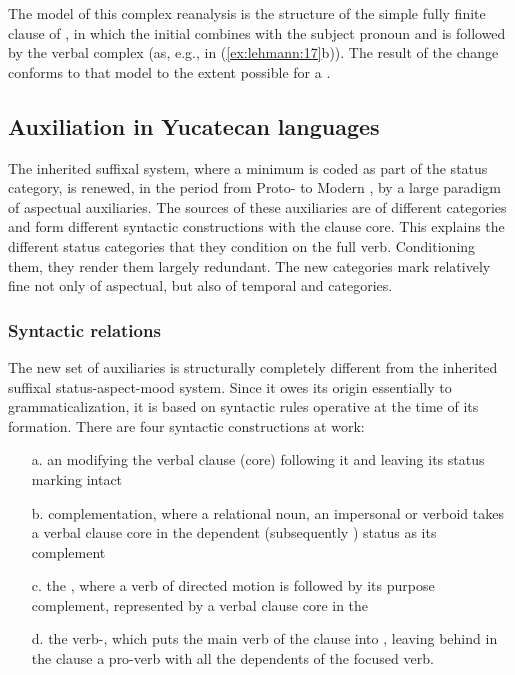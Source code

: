 \documentclass[output=paper]{langsci/langscibook}
\begin{document}
The model of this complex reanalysis is the structure of the simple fully finite clause of , in which the initial  combines with the  subject pronoun and is followed by the verbal complex (as, e.g., in (\ref{ex:lehmann:17}b)). The result of the change conforms to that model to the extent possible for a .

\subsection{Auxiliation in Yucatecan languages}\label{sec:lehmann:4.10}

The inherited suffixal system, where a minimum  is coded as part of the status category, is renewed, in the period from Proto- to Modern , by a large paradigm of aspectual auxiliaries. The sources of these auxiliaries are of different categories and form different syntactic constructions with the clause core. This explains the different status categories that they condition on the full verb. Conditioning them, they render them largely redundant. The new categories mark relatively fine  not only of aspectual, but also of temporal and  categories.

\subsubsection{Syntactic relations}\label{sec:lehmann:4.10.1}

The new set of auxiliaries is structurally completely different from the inherited suffixal status-aspect-mood system. Since it owes its origin essentially to grammaticalization, it is based on syntactic rules operative at the time of its formation. There are four syntactic constructions at work:

\begin{itemize}
\item[a.] an  modifying the verbal clause (core) following it and leaving its status marking intact

\item[b.]
complementation, where a relational noun, an impersonal  or  verboid takes a verbal clause core in the dependent (subsequently ) status as its complement

\item[c.] 
the , where a verb of directed motion is followed by its purpose complement, represented by a verbal clause core in the 

\item[d.] 
the verb-, which puts the main verb of the clause into , leaving behind in the  clause a pro-verb with all the dependents of the focused verb.
\end{itemize}
\end{document}
